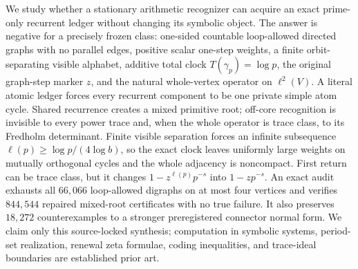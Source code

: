 We study whether a stationary arithmetic recognizer can acquire an exact
prime-only recurrent ledger without changing its symbolic object.  The answer
is negative for a precisely frozen class: one-sided countable loop-allowed
directed graphs with no parallel edges, positive scalar one-step weights, a
finite orbit-separating visible
alphabet, additive total clock $T(\gamma_p)=\log p$, the original graph-step
marker $z$, and the natural whole-vertex operator on $\ell^2(V)$.  A literal
atomic ledger forces every recurrent component to be one private simple atom
cycle.  Shared recurrence creates a mixed primitive root; off-core recognition
is invisible to every power trace and, when the whole operator is trace class,
to its Fredholm determinant.  Finite visible separation forces an infinite
subsequence $\ell(p)\ge \log p/(4\log b)$, so the exact clock leaves uniformly
large weights on mutually orthogonal cycles and the whole adjacency is
noncompact.  First return can be trace class, but it changes
$1-z^{\ell(p)}p^{-s}$ into $1-zp^{-s}$.  An exact audit exhausts all $66{,}066$
loop-allowed digraphs on at most four vertices and verifies $844{,}544$
repaired mixed-root certificates with no true failure.  It also preserves
$18{,}272$ counterexamples to a stronger preregistered connector normal form.
We claim only this source-locked synthesis; computation in symbolic systems,
period-set realization, renewal zeta formulae, coding inequalities, and
trace-ideal boundaries are established prior art.

